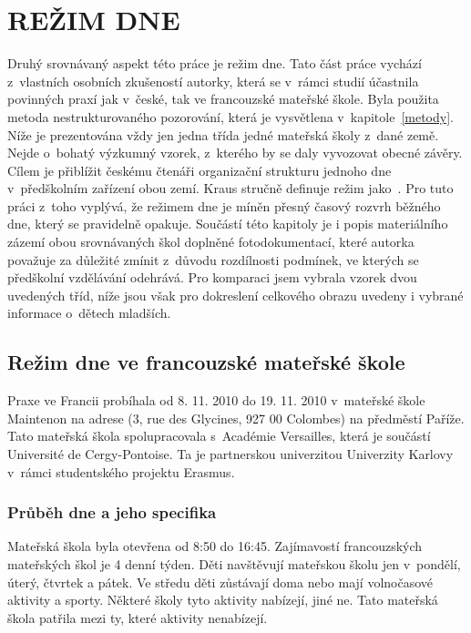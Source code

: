 \chapter{REŽIM DNE}
\label{rezim}

	Druhý srovnávaný aspekt této práce je režim dne. Tato část práce vychází z~vlastních osobních zkušeností autorky, která se v~rámci studií účastnila povinných praxí jak v~české, tak ve francouzské mateřské škole. Byla použita metoda nestrukturovaného pozorování, která je vysvětlena v~kapitole~\ref{metody}. Níže je prezentována vždy jen jedna třída jedné mateřská školy z~dané země. Nejde o~bohatý výzkumný vzorek, z~kterého by se daly vyvozovat obecné závěry. Cílem je přiblížit českému čtenáři organizační strukturu jednoho dne v~předškolním zařízení obou zemí. Kraus stručně definuje režim jako\textit{}~\citep[s.~700]{Kraus}.
	Pro tuto práci z~toho vyplývá, že režimem dne je míněn přesný časový rozvrh běžného dne, který se pravidelně opakuje.
	Součástí této kapitoly je i popis materiálního zázemí obou srovnávaných škol doplněné fotodokumentací, které autorka považuje za důležité zmínit z~důvodu rozdílnosti podmínek, ve kterých se předškolní vzdělávání odehrává.
	Pro komparaci jsem vybrala vzorek dvou uvedených tříd, níže jsou však pro dokreslení celkového obrazu uvedeny i vybrané informace o~dětech mladších.

	\section{Režim dne ve francouzské mateřské škole}

		Praxe ve Francii probíhala od 8. 11. 2010 do 19. 11. 2010 v~mateřské škole Maintenon na adrese (3, rue des Glycines, 927 00 Colombes) na předměstí Paříže. Tato mateřská škola spolupracovala s~Académie Versailles, která je součástí Université de Cergy-Pontoise. Ta je partnerskou univerzitou Univerzity Karlovy v~rámci studentského projektu Erasmus. 


		\subsection{Průběh dne a jeho specifika}

			Mateřská škola byla otevřena od 8:50 do 16:45. Zajímavostí francouzských mateřských škol je 4 denní týden. Děti navštěvují mateřskou školu jen v~pondělí, úterý, čtvrtek a pátek. Ve středu děti zůstávají doma nebo mají volnočasové aktivity a sporty. Některé školy tyto aktivity nabízejí, jiné ne. Tato mateřská škola patřila mezi ty, které aktivity nenabízejí. 
			
